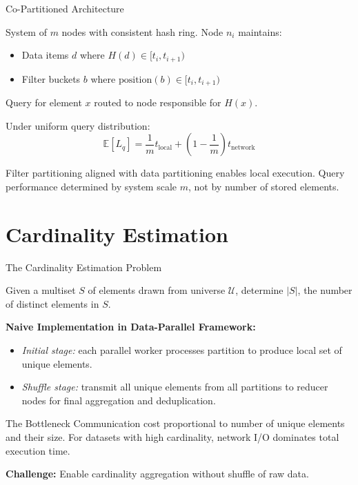 \documentclass{beamer}
\begin{document}
\begin{frame}{Co-Partitioned Architecture}

    \begin{definition}
        System of $m$ nodes with consistent hash ring. Node $n_i$ maintains:
        \begin{itemize}
            \item Data items $d$ where $H(d) \in [t_i, t_{i+1})$
            \item Filter buckets $b$ where $\text{position}(b) \in [t_i, t_{i+1})$
        \end{itemize}
        Query for element $x$ routed to node responsible for $H(x)$.
    \end{definition}

    \begin{theorem}
        Under uniform query distribution:
        $$\mathbb{E}[L_q] = \frac{1}{m} t_{\text{local}} + \left(1 - \frac{1}{m}\right) t_{\text{network}}$$
    \end{theorem}

    Filter partitioning aligned with data partitioning enables local execution. Query performance determined by system scale $m$, not by number of stored elements.

\end{frame}

\section{Cardinality Estimation}

\begin{frame}{The Cardinality Estimation Problem}

    \begin{definition}
        Given a multiset $S$ of elements drawn from universe $\mathcal{U}$, determine $|S|$, the number of distinct elements in $S$.
    \end{definition}

    \textbf{Naive Implementation in Data-Parallel Framework:}

    \begin{itemize}
        \item \emph{Initial stage:} each parallel worker processes partition to produce local set of unique elements.

        \item \emph{Shuffle stage:} transmit all unique elements from all partitions to reducer nodes for final aggregation and deduplication.
    \end{itemize}

    \begin{block}{The Bottleneck}
        Communication cost proportional to number of unique elements and their size. For datasets with high cardinality, network I/O dominates total execution time.
    \end{block}

    \textbf{Challenge:} Enable cardinality aggregation without shuffle of raw data.

\end{frame}
\end{document}
